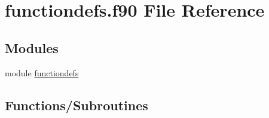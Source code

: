 \hypertarget{functiondefs_8f90}{
\section{functiondefs.f90 File Reference}
\label{functiondefs_8f90}
}
\subsection*{Modules}
\begin{DoxyCompactItemize}
\item 
module \hyperlink{namespacefunctiondefs}{functiondefs}
\end{DoxyCompactItemize}
\subsection*{Functions/Subroutines}
